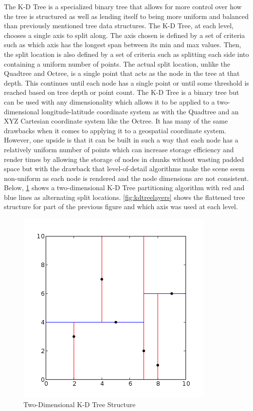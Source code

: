 The K-D Tree is a specialized binary tree that allows for more control over how
the tree is structured as well as lending itself to being more uniform and
balanced than previously mentioned tree data structures. The K-D Tree, at each
level, chooses a single axis to split along. The axis chosen is defined by a set
of criteria such as which axis has the longest span between its min and max
values. Then, the split location is also defined by a set of criteria such as
splitting each side into containing a uniform number of points. The actual split
location, unlike the Quadtree and Octree, is a single point that acts as the
node in the tree at that depth. This continues until each node has a single
point or until some threshold is reached based on tree depth or point count. The
K-D Tree is a binary tree but can be used with any dimensionality which allows
it to be applied to a two-dimensional longitude-latitude coordinate system as
with the Quadtree and an XYZ Cartesian coordinate system like the Octree. It has
many of the same drawbacks when it comes to applying it to a geospatial
coordinate system. However, one upside is that it can be built in such a way
that each node has a relatively uniform number of points which can increase
storage efficiency and render times by allowing the storage of nodes in chunks
without wasting padded space but with the drawback that level-of-detail
algorithms make the scene seem non-uniform as each node is rendered and the node
dimensions are not consistent. Below, \ref{fig:kdtree2d} shows a two-dimensional K-D Tree
partitioning algorithm with red and blue lines as alternating split locations.
\ref{fig:kdtreelayers} shows the flattened tree structure for part of the previous figure and
which axis was used at each level.

\begin{figure}[htb]
\begin{center}
\includegraphics[width=.5\linewidth]{images/kdtree_2d.png}
\end{center}
\caption{Two-Dimensional K-D Tree Structure {\cite{12_kdtree_2d}}}
\label{fig:kdtree2d}
\end{figure}

